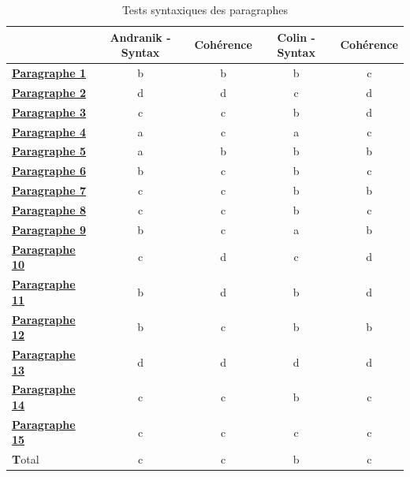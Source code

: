 \documentclass{rapport}
\begin{document}
            \begin{table}[H]
                \centering
                \begin{tabular}{l|cc|cc}
                    \toprule
                     & Andranik - Syntax & Cohérence & Colin - Syntax & Cohérence\\
                    \midrule
                    \textbf{\hyperref[appendix_paragraph_1]{Paragraphe 1}} & b & b & b & c \\
                    \textbf{\hyperref[appendix_paragraph_2]{Paragraphe 2}} & d & d & c & d \\
                    \textbf{\hyperref[appendix_paragraph_3]{Paragraphe 3}} & c & c & b & d \\
                    \textbf{\hyperref[appendix_paragraph_4]{Paragraphe 4}} & a & c & a & c \\
                    \textbf{\hyperref[appendix_paragraph_5]{Paragraphe 5}} & a & b & b & b \\
                    \textbf{\hyperref[appendix_paragraph_6]{Paragraphe 6}} & b & c & b & c \\
                    \textbf{\hyperref[appendix_paragraph_7]{Paragraphe 7}} & c & c & b & b \\
                    \textbf{\hyperref[appendix_paragraph_8]{Paragraphe 8}} & c & c & b & c \\
                    \textbf{\hyperref[appendix_paragraph_9]{Paragraphe 9}} & b & c & a & b \\
                    \textbf{\hyperref[appendix_paragraph_10]{Paragraphe 10}} & c & d & c & d \\
                    \textbf{\hyperref[appendix_paragraph_11]{Paragraphe 11}} & b & d & b & d \\
                    \textbf{\hyperref[appendix_paragraph_12]{Paragraphe 12}} & b & c & b & b \\
                    \textbf{\hyperref[appendix_paragraph_13]{Paragraphe 13}} & d & d & d & d \\
                    \textbf{\hyperref[appendix_paragraph_14]{Paragraphe 14}} & c & c & b & c \\
                    \textbf{\hyperref[appendix_paragraph_15]{Paragraphe 15}} & c & c & c & c \\
                    \textbf Total & c & c & b & c \\
                    \bottomrule
                \end{tabular}
                \caption{Tests syntaxiques des paragraphes}
                \label{tab:paragraph_syntax_tests}
            \end{table}
\end{document}
